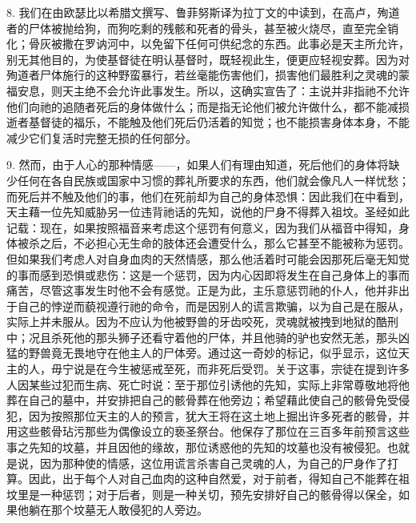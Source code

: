 8. 我们在由欧瑟比以希腊文撰写、鲁菲努斯译为拉丁文的中读到，在高卢，殉道者的尸体被抛给狗，而狗吃剩的残骸和死者的骨头，甚至被火烧尽，直至完全销化；骨灰被撒在罗讷河中，以免留下任何可供纪念的东西。此事必是天主所允许，别无其他目的，为使基督徒在明认基督时，既轻视此生，便更应轻视安葬。因为对殉道者尸体施行的这种野蛮暴行，若丝毫能伤害他们，损害他们最胜利之灵魂的蒙福安息，则天主绝不会允许此事发生。所以，这确实宣告了：主说并非指祂不允许他们向祂的追随者死后的身体做什么；而是指无论他们被允许做什么，都不能减损逝者基督徒的福乐，不能触及他们死后仍活着的知觉；也不能损害身体本身，不能减少它们复活时完整无损的任何部分。\par

9. 然而，由于人心的那种情感——，如果人们有理由知道，死后他们的身体将缺少任何在各自民族或国家中习惯的葬礼所要求的东西，他们就会像凡人一样忧愁；而死后并不触及他们的事，他们在死前却为自己的身体恐惧：因此我们在中看到，天主藉一位先知威胁另一位违背祂话的先知，说他的尸身不得葬入祖坟。圣经如此记载：现在，如果按照福音来考虑这个惩罚有何意义，因为我们从福音中得知，身体被杀之后，不必担心无生命的肢体还会遭受什么，那么它甚至不能被称为惩罚。但如果我们考虑人对自身血肉的天然情感，那么他活着时可能会因那死后毫无知觉的事而感到恐惧或悲伤：这是一个惩罚，因为内心因即将发生在自己身体上的事而痛苦，尽管这事发生时他不会有感觉。正是为此，主乐意惩罚祂的仆人，他并非出于自己的悖逆而藐视遵行祂的命令，而是因别人的谎言欺骗，以为自己是在服从，实际上并未服从。因为不应认为他被野兽的牙齿咬死，灵魂就被拽到地狱的酷刑中；况且杀死他的那头狮子还看守着他的尸体，并且他骑的驴也安然无恙，那头凶猛的野兽竟无畏地守在他主人的尸体旁。通过这一奇妙的标记，似乎显示，这位天主的人，毋宁说是在今生被惩戒至死，而非死后受罚。关于这事，宗徒在提到许多人因某些过犯而生病、死亡时说：至于那位引诱他的先知，实际上非常尊敬地将他葬在自己的墓中，并安排把自己的骸骨葬在他旁边；希望藉此使自己的骸骨免受侵犯，因为按照那位天主的人的预言，犹大王将在这土地上掘出许多死者的骸骨，并用这些骸骨玷污那些为偶像设立的亵圣祭台。他保存了那位在三百多年前预言这些事之先知的坟墓，并且因他的缘故，那位诱惑他的先知的坟墓也没有被侵犯。也就是说，因为那种使的情感，这位用谎言杀害自己灵魂的人，为自己的尸身作了打算。因此，出于每个人对自己血肉的这种自然爱，对于前者，得知自己不能葬在祖坟里是一种惩罚；对于后者，则是一种关切，预先安排好自己的骸骨得以保全，如果他躺在那个坟墓无人敢侵犯的人旁边。\par

